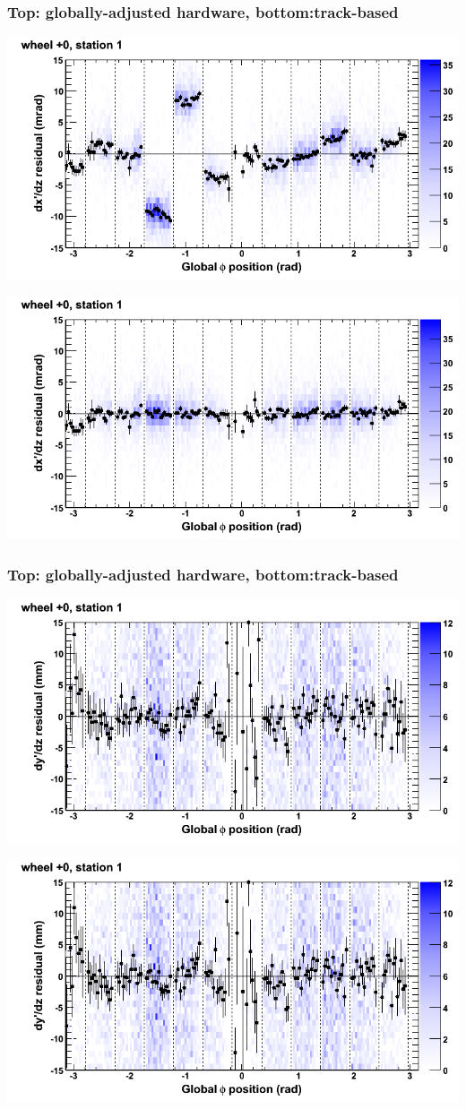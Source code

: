 \documentclass[compress]{beamer}
\begin{document}
\begin{frame}
\frametitle{Top: globally-adjusted hardware, bottom:track-based}
\includegraphics[width=0.7\linewidth]{NOV4_mapplots_HW/DTvsphi_st1whC_dxdz.png}

\includegraphics[width=0.7\linewidth]{NOV4_mapplots/DTvsphi_st1whC_dxdz.png}
\end{frame}

\begin{frame}
\frametitle{Top: globally-adjusted hardware, bottom:track-based}
\includegraphics[width=0.7\linewidth]{NOV4_mapplots_HW/DTvsphi_st1whC_dydz.png}

\includegraphics[width=0.7\linewidth]{NOV4_mapplots/DTvsphi_st1whC_dydz.png}
\end{frame}
\end{document}
